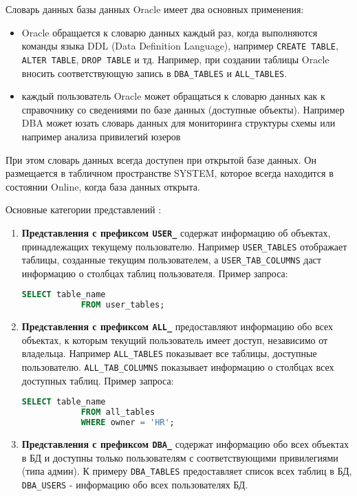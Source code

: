 \begin{enumerate}
    Словарь данных базы данных Oracle имеет два основных применения:
    \begin{itemize}
        \item Oracle обращается к словарю данных каждый раз, когда выполняются команды языка DDL (Data Definition Language), например \texttt{CREATE TABLE}, \texttt{ALTER TABLE}, \texttt{DROP TABLE} и тд. Например, при создании таблицы Oracle вносить соответствующую запись в \texttt{DBA\_TABLES} и \texttt{ALL\_TABLES}.
        \item каждый пользователь Oracle может обращаться к словарю данных как к справочнику со сведениями по базе данных (доступные объекты). Например DBA может юзать словарь данных для мониторинга структуры схемы или например анализа привилегий юзеров
    \end{itemize}

    При этом словарь данных всегда доступен при открытой базе данных. Он размещается в табличном пространстве SYSTEM, которое всегда находится в состоянии Online, когда база данных открыта.

    Основные категории представлений \autocite{oracledbdoc1}:
    \begin{enumerate}

        \item \textbf{Представления с префиксом \texttt{USER\_}} содержат информацию об объектах, принадлежащих текущему пользователю. Например \texttt{USER\_TABLES} отображает таблицы, созданные текущим пользователем, а \texttt{USER\_TAB\_COLUMNS} даст информацию о столбцах таблиц пользователя.
        Пример запроса:
        \begin{lstlisting}[language=SQL]
            SELECT table_name 
            FROM user_tables;
        \end{lstlisting}

        \item \textbf{Представления с префиксом \texttt{ALL\_}} предоставляют информацию обо всех объектах, к которым текущий пользователь имеет доступ, независимо от владельца. Например \texttt{ALL\_TABLES} показывает все таблицы, доступные пользователю. \texttt{ALL\_TAB\_COLUMNS} показывает информацию о столбцах всех доступных таблиц.
        Пример запроса:
        \begin{lstlisting}[language=SQL]
            SELECT table_name 
            FROM all_tables 
            WHERE owner = 'HR';
        \end{lstlisting}

        \item \textbf{Представления с префиксом \texttt{DBA\_}} содержат информацию обо всех объектах в БД и доступны только пользователям с соответствующими привилегиями (типа админ). К примеру \texttt{DBA\_TABLES} предоставляет список всех таблиц в БД, \texttt{DBA\_USERS} - информацию обо всех пользователях БД.
        

\end{enumerate}
\end{enumerate}
